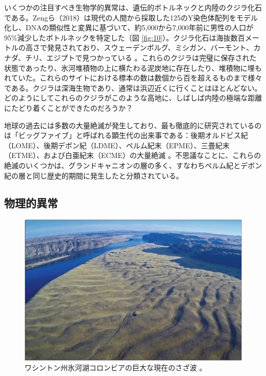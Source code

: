 \documentclass[10pt,twocolumn,letterpaper]{article}
\begin{document}
いくつかの注目すべき生物学的異常は、遺伝的ボトルネックと内陸のクジラ化石である。Zengら（2018）は現代の人間から採取した125のY染色体配列をモデル化し、DNAの類似性と変異に基づいて、約5,000から7,000年前に男性の人口が95\%減少したボトルネックを特定した（図 \ref{fig:10}）\cite{62}。クジラ化石は海抜数百メートルの高さで発見されており、スウェーデンボルグ、ミシガン、バーモント、カナダ、チリ、エジプトで見つかっている \cite{63,64,65,66}。これらのクジラは完璧に保存された状態であったり、氷河堆積物の上に横たわる泥炭地に存在したり、堆積物に埋もれていた。これらのサイトにおける標本の数は数個から百を超えるものまで様々である。クジラは深海生物であり、通常は浜辺近くに行くことはほとんどない。どのようにしてこれらのクジラがこのような高地に、しばしば内陸の極端な距離にたどり着くことができたのだろうか？

地球の過去には多数の大量絶滅が発生しており、最も徹底的に研究されているのは「ビッグファイブ」と呼ばれる顕生代の出来事である：後期オルドビス紀（LOME）、後期デボン紀（LDME）、ペルム紀末（EPME）、三畳紀末（ETME）、および白亜紀末（ECME）の大量絶滅 \cite{88,89}。不思議なことに、これらの絶滅のいくつかは、グランドキャニオンの層の多く、すなわちペルム紀とデボン紀の層と同じ歴史的期間に発生したと分類されている。

\subsection{物理的異常}

\begin{figure}[b]
\begin{center}
   \includegraphics[width=1\linewidth]{columbia.jpg}
\end{center}
   \caption{ワシントン州氷河湖コロンビアの巨大な現在のさざ波 \cite{80}。}
\label{fig:11}
\label{fig:onecol}
\end{figure}
\end{document}
